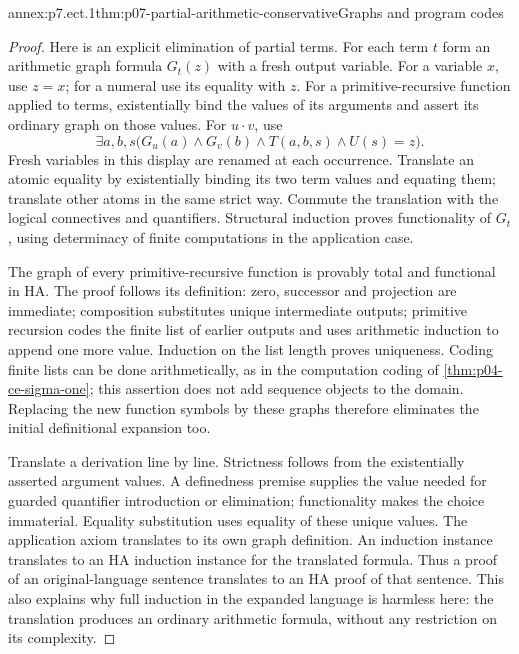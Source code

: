 \begin{annexitem}{annex:p7.ect.1}{thm:p07-partial-arithmetic-conservative}{Graphs and program codes}
\begin{proof}
Here is an explicit elimination of partial terms. For each term \(t\)
form an arithmetic graph formula \(G_t(z)\) with a fresh output
variable. For a variable \(x\), use \(z=x\); for a numeral use
its equality with \(z\). For a primitive-recursive function applied
to terms, existentially bind the values of its arguments and assert
its ordinary graph on those values. For \(u\mathbin{\cdot}v\), use
\[
 \exists a,b,s\bigl(G_u(a)\land G_v(b)\land
                      T(a,b,s)\land U(s)=z\bigr).
\]
Fresh variables in this display are renamed at each occurrence.
Translate an atomic equality by existentially binding its two term
values and equating them; translate other atoms in the same strict
way. Commute the translation with the logical connectives and
quantifiers. Structural induction proves functionality of \(G_t\),
using determinacy of finite computations in the application case.

The graph of every primitive-recursive function is provably total
and functional in HA. The proof follows its definition: zero,
successor and projection are immediate; composition substitutes
unique intermediate outputs; primitive recursion codes the finite
list of earlier outputs and uses arithmetic induction to append one
more value. Induction on the list length proves uniqueness. Coding
finite lists can be done arithmetically, as in the computation coding
of \cref{thm:p04-ce-sigma-one}; this assertion does not add sequence
objects to the domain. Replacing the new function symbols by these
graphs therefore eliminates the initial definitional expansion too.

Translate a derivation line by line. Strictness follows from the
existentially asserted argument values. A definedness premise supplies
the value needed for guarded quantifier introduction or elimination;
functionality makes the choice immaterial. Equality substitution uses
equality of these unique values. The application axiom translates
to its own graph definition. An induction instance translates to an
HA induction instance for the translated formula. Thus a proof of
an original-language sentence translates to an HA proof of that
sentence. This also explains why full induction in the expanded
language is harmless here: the translation produces an ordinary
arithmetic formula, without any restriction on its complexity.


\end{proof}
\end{annexitem}
